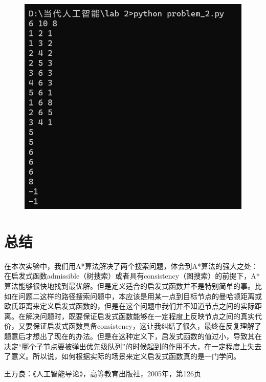 \documentclass{article}
\begin{document}
\begin{figure}[H]
    \centering
    \includegraphics[width=0.5\linewidth]{image6.png}
    \label{fig:enter-label}
\end{figure}

\section{总结}
在本次实验中，我们用A*算法解决了两个搜索问题，体会到A*算法的强大之处：在启发式函数admissible（树搜索）或者具有consistency（图搜索）的前提下，A*算法能够很快地找到最优解。但是定义适合的启发式函数并不是特别简单的事。比如在问题二这样的路径搜索问题中，本应该是用某一点到目标节点的曼哈顿距离或欧氏距离来定义启发式函数的，但是在这个问题中我们并不知道节点之间的实际距离。在解决问题时，既要保证启发式函数能够在一定程度上反映节点之间的真实代价，又要保证启发式函数具备consistency，这让我纠结了很久，最终在反复理解了题意后才想出了现在的办法。但是在这种定义下，启发式函数的值过小，导致其在决定“哪个子节点要被弹出优先级队列”的时候起到的作用不大，在一定程度上失去了意义。所以说，如何根据实际的场景来定义启发式函数真的是一门学问。

\begin{thebibliography}{99}  

王万良：《人工智能导论》，高等教育出版社，2005年，第126页
\label{ref1}
\end{thebibliography}
\end{document}

